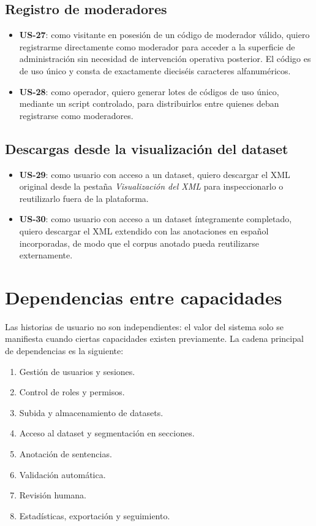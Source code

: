\subsection{Registro de moderadores}

\begin{itemize}
	\item \textbf{US-27}: como visitante en posesión de un código de moderador válido,
	      quiero registrarme directamente como moderador para acceder a la superficie de
	      administración sin necesidad de intervención operativa posterior. El código es
	      de uso único y consta de exactamente dieciséis caracteres alfanuméricos.
	\item \textbf{US-28}: como operador, quiero generar lotes de códigos de uso único,
	      mediante un script controlado, para distribuirlos entre quienes deban
	      registrarse como moderadores.
\end{itemize}

\subsection{Descargas desde la visualización del dataset}

\begin{itemize}
	\item \textbf{US-29}: como usuario con acceso a un dataset, quiero descargar el XML
	      original desde la pestaña \textit{Visualización del XML} para inspeccionarlo o
	      reutilizarlo fuera de la plataforma.
	\item \textbf{US-30}: como usuario con acceso a un dataset íntegramente completado,
	      quiero descargar el XML extendido con las anotaciones en español incorporadas,
	      de modo que el corpus anotado pueda reutilizarse externamente.
\end{itemize}

\section{Dependencias entre capacidades}

Las historias de usuario no son independientes: el valor del sistema solo se
manifiesta cuando ciertas capacidades existen previamente. La cadena principal
de dependencias es la siguiente:

\begin{enumerate}
	\item Gestión de usuarios y sesiones.
	\item Control de roles y permisos.
	\item Subida y almacenamiento de datasets.
	\item Acceso al dataset y segmentación en secciones.
	\item Anotación de sentencias.
	\item Validación automática.
	\item Revisión humana.
	\item Estadísticas, exportación y seguimiento.
\end{enumerate}

